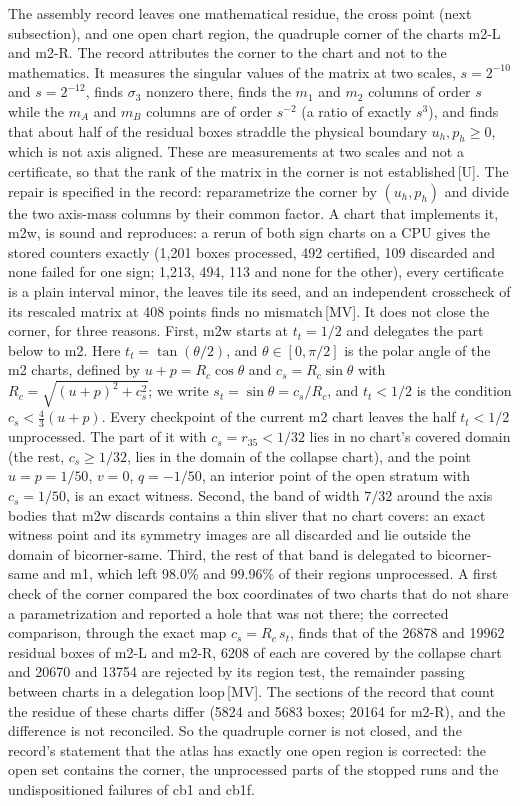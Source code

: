 \documentclass[11pt]{article}
\theoremstyle{definition}
\theoremstyle{remark}
\newcommand{\mk}[1]{\,{\scriptsize[#1]}}
\newcommand{\MV}{\mk{MV}}
\newcommand{\Um}{\mk{U}}
\begin{document}
The assembly record leaves one mathematical residue, the cross point (next subsection), and one open chart region, the
quadruple corner of the charts m2-L and m2-R. The record attributes the corner to the chart and not to the mathematics. It measures the
singular values of the matrix at two scales, $s=2^{-10}$ and $s=2^{-12}$, finds $\sigma_3$ nonzero there, finds the $m_1$ and $m_2$ columns of order $s$ while the
$m_A$ and $m_B$ columns are of order $s^{-2}$ (a ratio of exactly $s^3$), and finds that about half of the residual boxes straddle the physical boundary
$u_h,p_h\ge0$, which is not axis aligned. These are measurements at two scales and not a certificate, so that the rank of the matrix in the corner is not
established\Um. The repair is specified in the record: reparametrize the corner by $(u_h,p_h)$ and divide the two axis-mass columns by their common factor. A chart that
implements it, m2w, is sound and reproduces: a rerun of both sign charts on a CPU gives the stored counters exactly (1,201 boxes processed, 492 certified, 109 discarded and none failed for one sign;
1,213, 494, 113 and none for the other), every certificate is a plain interval minor, the leaves tile its seed, and an independent crosscheck of its rescaled matrix at 408 points finds no mismatch\MV.
It does not close the corner, for three reasons. First, m2w starts at $t_t=1/2$ and delegates the part below to m2. Here $t_t=\tan(\theta/2)$, and $\theta\in[0,\pi/2]$ is the polar angle of the m2 charts, defined by $u+p=R_c\cos\theta$ and $c_s=R_c\sin\theta$ with $R_c=\sqrt{(u+p)^2+c_s^2}$; we write $s_t=\sin\theta=c_s/R_c$, and $t_t<1/2$ is the condition $c_s<\tfrac43(u+p)$. Every
checkpoint of the current m2 chart leaves the half $t_t<1/2$ unprocessed. The part of it with $c_s=r_{35}<1/32$ lies in no chart's covered domain (the rest, $c_s\ge1/32$, lies in the domain of the collapse chart), and the point
$u=p=1/50$, $v=0$, $q=-1/50$, an interior point of the open stratum with $c_s=1/50$, is an exact witness. Second, the band of width $7/32$ around the axis bodies that m2w discards contains a thin sliver that no chart covers:
an exact witness point and its symmetry images are all discarded and lie outside the domain of bicorner-same. Third, the rest of that band is delegated to bicorner-same and m1, which left 98.0\% and 99.96\%
of their regions unprocessed. A first check of the corner compared the box coordinates of two charts that do not share a parametrization and reported a hole that was not there; the
corrected comparison, through the exact map $c_s=R_c\,s_t$, finds that of the 26878 and 19962 residual boxes of m2-L and m2-R, 6208 of each are covered by the collapse chart and
20670 and 13754 are rejected by its region test, the remainder passing between charts in a delegation loop\MV. The sections of the record that count the residue of these charts
differ (5824 and 5683 boxes; 20164 for m2-R), and the difference is not reconciled. So the quadruple corner is not closed, and the record's statement that the atlas has exactly one open region is corrected:
the open set contains the corner, the unprocessed parts of the stopped runs and the undispositioned failures of cb1 and cb1f.
\end{document}
